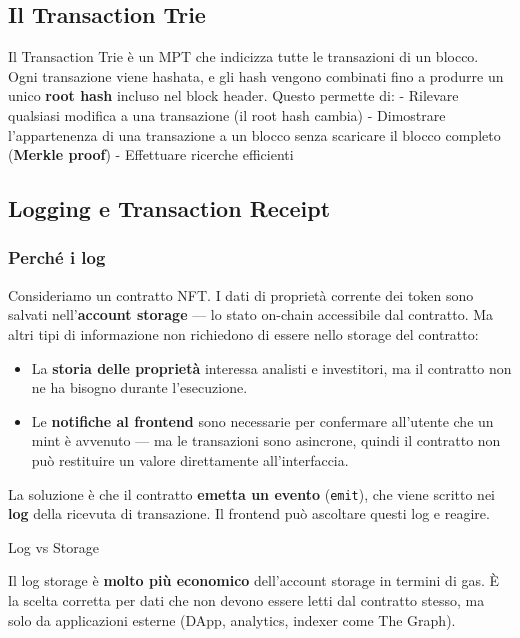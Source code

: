 \documentclass[
  italian,
  openany]{book}
\providecommand{\tightlist}{%
  \setlength{\itemsep}{0pt}\setlength{\parskip}{0pt}}
\begin{document}
\subsection{Il Transaction Trie}\label{il-transaction-trie}

Il Transaction Trie è un MPT che indicizza tutte le transazioni di un
blocco. Ogni transazione viene hashata, e gli hash vengono combinati
fino a produrre un unico \textbf{root hash} incluso nel block header.
Questo permette di: - Rilevare qualsiasi modifica a una transazione (il
root hash cambia) - Dimostrare l'appartenenza di una transazione a un
blocco senza scaricare il blocco completo (\textbf{Merkle proof}) -
Effettuare ricerche efficienti

\subsection{Logging e Transaction
Receipt}\label{logging-e-transaction-receipt}

\subsubsection{Perché i log}\label{perchuxe9-i-log}

Consideriamo un contratto NFT. I dati di proprietà corrente dei token
sono salvati nell'\textbf{account storage} --- lo stato on-chain
accessibile dal contratto. Ma altri tipi di informazione non richiedono
di essere nello storage del contratto:

\begin{itemize}
\tightlist
\item
  La \textbf{storia delle proprietà} interessa analisti e investitori,
  ma il contratto non ne ha bisogno durante l'esecuzione.
\item
  Le \textbf{notifiche al frontend} sono necessarie per confermare
  all'utente che un mint è avvenuto --- ma le transazioni sono
  asincrone, quindi il contratto non può restituire un valore
  direttamente all'interfaccia.
\end{itemize}

La soluzione è che il contratto \textbf{emetta un evento}
(\texttt{emit}), che viene scritto nei \textbf{log} della ricevuta di
transazione. Il frontend può ascoltare questi log e reagire.

\begin{callouttip}{Log vs Storage}

Il log storage è \textbf{molto più economico} dell'account storage in
termini di gas. È la scelta corretta per dati che non devono essere
letti dal contratto stesso, ma solo da applicazioni esterne (DApp,
analytics, indexer come The Graph).

\end{callouttip}
\end{document}

